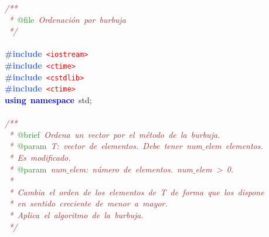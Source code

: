 \noindent
\mbox{}\textit{\textcolor{Brown}{/**}} \\
\mbox{}\textit{\textcolor{Brown}{\ *\ }}\textcolor{ForestGreen}{@file}\textit{\textcolor{Brown}{\ Ordenación\ por\ burbuja}} \\
\mbox{}\textit{\textcolor{Brown}{\ */}} \\
\mbox{} \\
\mbox{}\textbf{\textcolor{RoyalBlue}{\#include}}\ \texttt{\textcolor{Red}{\textless{}iostream\textgreater{}}} \\
\mbox{}\textbf{\textcolor{RoyalBlue}{\#include}}\ \texttt{\textcolor{Red}{\textless{}ctime\textgreater{}}} \\
\mbox{}\textbf{\textcolor{RoyalBlue}{\#include}}\ \texttt{\textcolor{Red}{\textless{}cstdlib\textgreater{}}} \\
\mbox{}\textbf{\textcolor{RoyalBlue}{\#include}}\ \texttt{\textcolor{Red}{\textless{}ctime\textgreater{}}} \\
\mbox{}\textbf{\textcolor{Blue}{using}}\ \textbf{\textcolor{Blue}{namespace}}\ std\textcolor{BrickRed}{;} \\
\mbox{} \\
\mbox{}\textit{\textcolor{Brown}{/**}} \\
\mbox{}\textit{\textcolor{Brown}{\ *\ }}\textcolor{ForestGreen}{@brief}\textit{\textcolor{Brown}{\ Ordena\ un\ vector\ por\ el\ método\ de\ la\ burbuja.}} \\
\mbox{}\textit{\textcolor{Brown}{\ *\ }}\textcolor{ForestGreen}{@param}\textit{\textcolor{Brown}{\ T:\ vector\ de\ elementos.\ Debe\ tener\ num$\_$elem\ elementos.}} \\
\mbox{}\textit{\textcolor{Brown}{\ *\ Es\ modificado.}} \\
\mbox{}\textit{\textcolor{Brown}{\ *\ }}\textcolor{ForestGreen}{@param}\textit{\textcolor{Brown}{\ num$\_$elem:\ número\ de\ elementos.\ num$\_$elem\ \textgreater{}\ 0.}} \\
\mbox{}\textit{\textcolor{Brown}{\ *\ }} \\
\mbox{}\textit{\textcolor{Brown}{\ *\ Cambia\ el\ orden\ de\ los\ elementos\ de\ T\ de\ forma\ que\ los\ dispone}} \\
\mbox{}\textit{\textcolor{Brown}{\ *\ en\ sentido\ creciente\ de\ menor\ a\ mayor.}} \\
\mbox{}\textit{\textcolor{Brown}{\ *\ Aplica\ el\ algoritmo\ de\ la\ burbuja.}} \\
\mbox{}\textit{\textcolor{Brown}{\ */}} \\
